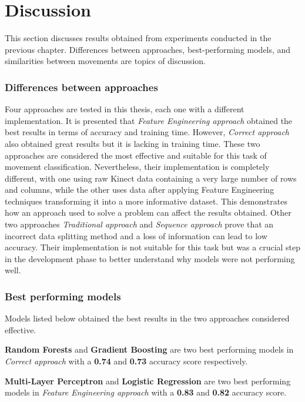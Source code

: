 \section{Discussion}
        
        This section discusses results obtained from experiments conducted in the previous chapter. Differences between approaches, best-performing models, and similarities between movements are topics of discussion. 

        \subsubsection{Differences between approaches}
            Four approaches are tested in this thesis, each one with a different implementation. It is presented that \textit{Feature Engineering approach} obtained the best results in terms of accuracy and training time. However, \textit{Correct approach} also obtained great results but it is lacking in training time. These two approaches are considered the most effective and suitable for this task of movement classification. Nevertheless, their implementation is completely different, with one using raw Kinect data containing a very large number of rows and columns, while the other uses data after applying Feature Engineering techniques transforming it into a more informative dataset. This demonstrates how an approach used to solve a problem can affect the results obtained. Other two approaches \textit{Traditional approach} and \textit{Sequence approach} prove that an incorrect data splitting method and a loss of information can lead to low accuracy. Their implementation is not suitable for this task but was a crucial step in the development phase to better understand why models were not performing well. 

        \subsubsection{Best performing models}
            Models listed below obtained the best results in the two approaches considered effective. 

            \begin{boxlabel}
                \item \textbf{Random Forests} and \textbf{Gradient Boosting} are two best performing models in \textit{Correct approach} with a \textbf{0.74} and \textbf{0.73} accuracy score respectively.
                \item \textbf{Multi-Layer Perceptron} and \textbf{Logistic Regression} are two best performing models in \textit{Feature Engineering approach} with a \textbf{0.83} and \textbf{0.82} accuracy score.
            \end{boxlabel}

